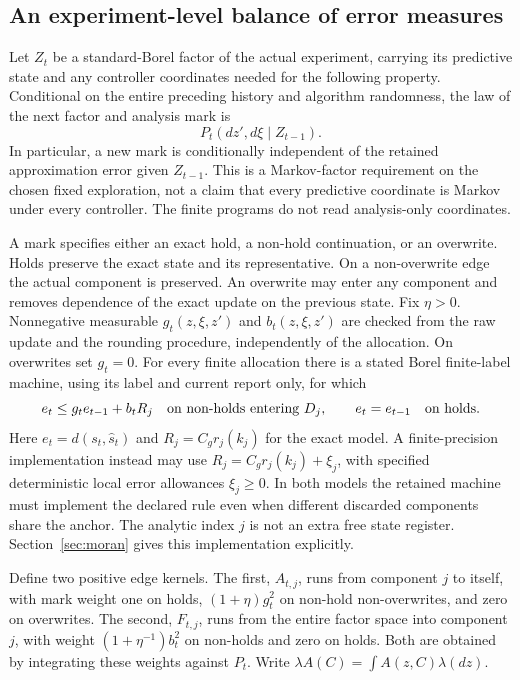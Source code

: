 \subsection{An experiment-level balance of error measures}
Let $Z_t$ be a standard-Borel factor of the actual experiment, carrying its predictive state and any controller coordinates needed for the following property. Conditional on the entire preceding history and algorithm randomness, the law of the next factor and analysis mark is
\[
 P_t(dz',d\xi\mid Z_{t-1}).
\]
In particular, a new mark is conditionally independent of the retained approximation error given $Z_{t-1}$. This is a Markov-factor requirement on the chosen fixed exploration, not a claim that every predictive coordinate is Markov under every controller. The finite programs do not read analysis-only coordinates.

A mark specifies either an exact hold, a non-hold continuation, or an overwrite. Holds preserve the exact state and its representative. On a non-overwrite edge the actual component is preserved. An overwrite may enter any component and removes dependence of the exact update on the previous state. Fix $\eta>0$. Nonnegative measurable $g_t(z,\xi,z')$ and $b_t(z,\xi,z')$ are checked from the raw update and the rounding procedure, independently of the allocation. On overwrites set $g_t=0$. For every finite allocation there is a stated Borel finite-label machine, using its label and current report only, for which
\begin{equation}\label{eq:bridge-local}
 e_t\le g_t e_{t-1}+b_t R_j\quad\hbox{on non-holds entering }D_j,
 \qquad e_t=e_{t-1}\quad\hbox{on holds}.
\end{equation}
Here $e_t=d(s_t,\widehat s_t)$ and $R_j=C_g r_j(k_j)$ for the exact model. A finite-precision implementation instead may use $R_j=C_g r_j(k_j)+\xi_j$, with specified deterministic local error allowances $\xi_j\ge0$. In both models the retained machine must implement the declared rule even when different discarded components share the anchor. The analytic index $j$ is not an extra free state register. Section~\ref{sec:moran} gives this implementation explicitly.

Define two positive edge kernels. The first, $A_{t,j}$, runs from component $j$ to itself, with mark weight one on holds, $(1+\eta)g_t^2$ on non-hold non-overwrites, and zero on overwrites. The second, $F_{t,j}$, runs from the entire factor space into component $j$, with weight $(1+\eta^{-1})b_t^2$ on non-holds and zero on holds. Both are obtained by integrating these weights against $P_t$. Write $\lambda A(C)=\int A(z,C)\lambda(dz)$.

